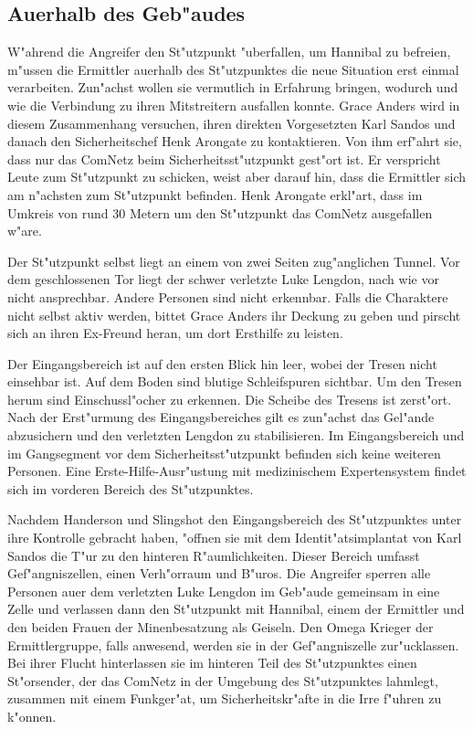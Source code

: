 \subsection[Au\3erhalb des Geb"audes]{Au\3erhalb des Geb"audes}
W"ahrend die Angreifer den St"utzpunkt "uberfallen, um Hannibal zu befreien, m"ussen die Ermittler au\3erhalb des St"utzpunktes die neue Situation erst einmal verarbeiten. Zun"achst wollen sie vermutlich in Erfahrung bringen, wodurch und wie die Verbindung zu ihren Mitstreitern ausfallen konnte. Grace Anders wird in diesem Zusammenhang versuchen, ihren direkten Vorgesetzten Karl Sandos und danach den Sicherheitschef Henk Arongate zu kontaktieren. Von ihm erf"ahrt sie, dass nur das ComNetz beim Sicherheitsst"utzpunkt gest"ort ist. Er verspricht Leute zum St"utzpunkt zu schicken, weist aber darauf hin, dass die Ermittler sich am n"achsten zum St"utzpunkt befinden. Henk Arongate erkl"art, dass im Umkreis von rund 30 Metern um den St"utzpunkt das ComNetz ausgefallen w"are. 

Der St"utzpunkt selbst liegt an einem von zwei Seiten zug"anglichen Tunnel. Vor dem geschlossenen Tor liegt der schwer verletzte Luke Lengdon, nach wie vor nicht ansprechbar. Andere Personen sind nicht erkennbar. Falls die Charaktere nicht selbst aktiv werden, bittet Grace Anders ihr Deckung zu geben und pirscht sich an ihren Ex-Freund heran, um dort Ersthilfe zu leisten.

Der Eingangsbereich ist auf den ersten Blick hin leer, wobei der Tresen nicht einsehbar ist. Auf dem Boden sind blutige Schleifspuren  sichtbar. Um den Tresen herum sind Einschussl"ocher zu erkennen. Die Scheibe des Tresens ist zerst"ort. Nach der Erst"urmung des Eingangsbereiches gilt es zun"achst das Gel"ande abzusichern und den verletzten Lengdon zu stabilisieren. Im Eingangsbereich und im Gangsegment vor dem Sicherheitsst"utzpunkt befinden sich keine weiteren Personen. Eine Erste-Hilfe-Ausr"ustung mit medizinischem Expertensystem findet sich im vorderen Bereich des St"utzpunktes.

Nachdem Handerson und Slingshot den Eingangsbereich des St"utzpunktes unter ihre Kontrolle gebracht haben, "offnen sie mit dem Identit"atsimplantat von Karl Sandos die T"ur zu den hinteren R"aumlichkeiten. Dieser Bereich umfasst Gef"angniszellen, einen Verh"orraum und B"uros. Die Angreifer sperren alle Personen au\3er dem verletzten Luke Lengdon im Geb"aude gemeinsam in eine Zelle und verlassen dann den St"utzpunkt mit Hannibal, einem der Ermittler und den beiden Frauen der Minenbesatzung als Geiseln. Den Omega Krieger der Ermittlergruppe, falls anwesend, werden sie in der Gef"angniszelle zur"ucklassen. Bei ihrer Flucht hinterlassen sie im hinteren Teil des St"utzpunktes einen St"orsender, der das ComNetz in der Umgebung des St"utzpunktes lahmlegt, zusammen mit einem Funkger"at, um Sicherheitskr"afte in die Irre f"uhren zu k"onnen.

